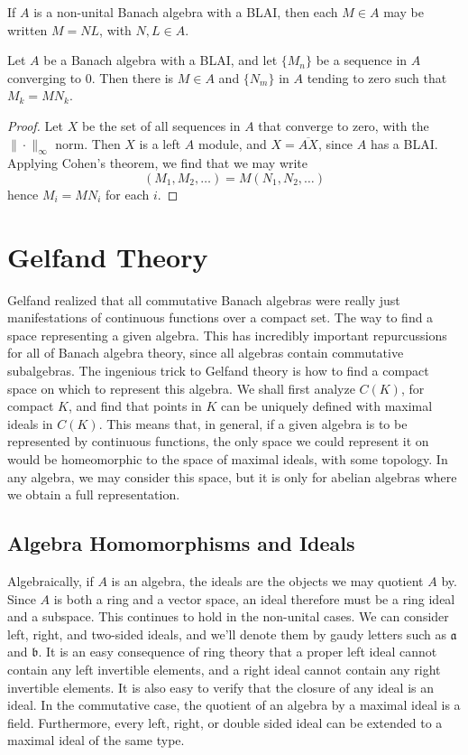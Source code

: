 \begin{corollary}
    If $A$ is a non-unital Banach algebra with a BLAI, then each $M \in A$ may be written $M = NL$, with $N,L \in A$.
\end{corollary}

\begin{corollary}
    Let $A$ be a Banach algebra with a BLAI, and let $\{ M_n \}$ be a sequence in $A$ converging to 0. Then there is $M \in A$ and $\{ N_m \}$ in $A$ tending to zero such that $M_k = M N_k$.
\end{corollary}
\begin{proof}
    Let $X$ be the set of all sequences in $A$ that converge to zero, with the $\| \cdot \|_\infty$ norm. Then $X$ is a left $A$ module, and $X = \overline{AX}$, since $A$ has a BLAI. Applying Cohen's theorem, we find that we may write
    \[ (M_1, M_2, \dots) = M (N_1, N_2, \dots) \]
    hence $M_i = M N_i$ for each $i$.
\end{proof}





\section{Gelfand Theory}

Gelfand realized that all commutative Banach algebras were really just manifestations of continuous functions over a compact set. The way to find a space representing a given algebra. This has incredibly important repurcussions for all of Banach algebra theory, since all algebras contain commutative subalgebras. The ingenious trick to Gelfand theory is how to find a compact space on which to represent this algebra. We shall first analyze $C(K)$, for compact $K$, and find that points in $K$ can be uniquely defined with maximal ideals in $C(K)$. This means that, in general, if a given algebra is to be represented by continuous functions, the only space we could represent it on would be homeomorphic to the space of maximal ideals, with some topology. In any algebra, we may consider this space, but it is only for abelian algebras where we obtain a full representation.

\subsection{Algebra Homomorphisms and Ideals}

Algebraically, if $A$ is an algebra, the ideals are the objects we may quotient $A$ by. Since $A$ is both a ring and a vector space, an ideal therefore must be a ring ideal and a subspace. This continues to hold in the non-unital cases. We can consider left, right, and two-sided ideals, and we'll denote them by gaudy letters such as $\mathfrak{a}$ and $\mathfrak{b}$. It is an easy consequence of ring theory that a proper left ideal cannot contain any left invertible elements, and a right ideal cannot contain any right invertible elements. It is also easy to verify that the closure of any ideal is an ideal. In the commutative case, the quotient of an algebra by a maximal ideal is a field. Furthermore, every left, right, or double sided ideal can be extended to a maximal ideal of the same type.

